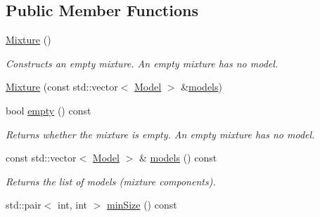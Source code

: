 \subsection*{Public Member Functions}
\begin{DoxyCompactItemize}
\item 
\hypertarget{class_f_f_l_d_1_1_mixture_a2f643bf662e2ff5ce3499ced719d86c4}{\hyperlink{class_f_f_l_d_1_1_mixture_a2f643bf662e2ff5ce3499ced719d86c4}{Mixture} ()}\label{class_f_f_l_d_1_1_mixture_a2f643bf662e2ff5ce3499ced719d86c4}

\begin{DoxyCompactList}\small\item\em Constructs an empty mixture. An empty mixture has no model. \end{DoxyCompactList}\item 
\hyperlink{class_f_f_l_d_1_1_mixture_af9aac2cd5787a50981ea8a3fa91aefd3}{Mixture} (const std\-::vector$<$ \hyperlink{class_f_f_l_d_1_1_model}{Model} $>$ \&\hyperlink{class_f_f_l_d_1_1_mixture_aa35341d4e3ad879bf8fe29eca6685531}{models})
\item 
\hypertarget{class_f_f_l_d_1_1_mixture_a32edabbb5a2a517bbaea597fea88dde1}{bool \hyperlink{class_f_f_l_d_1_1_mixture_a32edabbb5a2a517bbaea597fea88dde1}{empty} () const }\label{class_f_f_l_d_1_1_mixture_a32edabbb5a2a517bbaea597fea88dde1}

\begin{DoxyCompactList}\small\item\em Returns whether the mixture is empty. An empty mixture has no model. \end{DoxyCompactList}\item 
\hypertarget{class_f_f_l_d_1_1_mixture_aa35341d4e3ad879bf8fe29eca6685531}{const std\-::vector$<$ \hyperlink{class_f_f_l_d_1_1_model}{Model} $>$ \& \hyperlink{class_f_f_l_d_1_1_mixture_aa35341d4e3ad879bf8fe29eca6685531}{models} () const }\label{class_f_f_l_d_1_1_mixture_aa35341d4e3ad879bf8fe29eca6685531}

\begin{DoxyCompactList}\small\item\em Returns the list of models (mixture components). \end{DoxyCompactList}\item 
\hypertarget{class_f_f_l_d_1_1_mixture_ae3718178c80187b05019b7f8332d1ada}{std\-::pair$<$ int, int $>$ \hyperlink{class_f_f_l_d_1_1_mixture_ae3718178c80187b05019b7f8332d1ada}{min\-Size} () const }\label{class_f_f_l_d_1_1_mixture_ae3718178c80187b05019b7f8332d1ada}


\end{DoxyCompactItemize}
